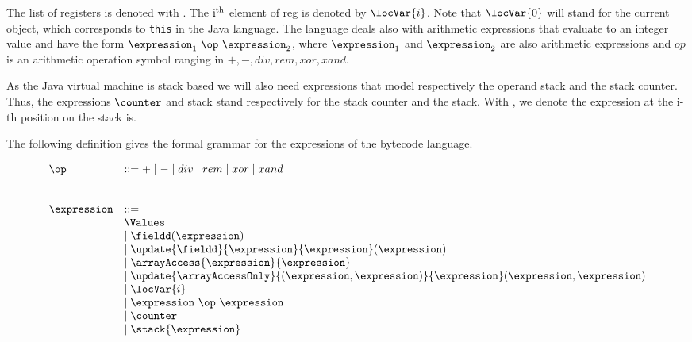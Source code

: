 The list of registers is denoted with \locVarOnly. The $\rm{i^{th}}$ element of \textrm{reg} is denoted by 
$\locVar{i}$. Note that $\locVar{0}$ will stand for the current object, 
which corresponds to \texttt{this} in the Java language. 
 The language deals also with arithmetic expressions that evaluate to an integer value and have the form $\expression_1 \ \op \ \expression_2 $,
 where  $ \expression_1$ and $\expression_2$ are also arithmetic expressions and $op$ is an arithmetic operation symbol
 ranging in $+, - , div, rem , xor, xand $. 

As the Java virtual machine is stack based we will also 
need expressions that model respectively the operand stack and the stack counter.
Thus, the expressions $\counter$ and  \textrm{stack} stand respectively for the stack counter and the stack. 
With , we denote the expression at the \textrm{i}-th position 
on the stack is. 

The following definition gives the formal grammar for the expressions of the bytecode language.
\begin{Expression} \label{expr}
    
\end{Expression}

  $$ 
  \begin{array}{ll}  
    \op             & ::= + \mid - \mid div \mid rem \mid xor \mid xand  \\
		    &                                                \\
		    &                                                \\
    \expression     & ::= \\
                    &  \Values \\
	            &  \mid  \fieldd(\expression) \\
		    &  \mid  \update{\fieldd}{ \expression}{\expression}(\expression) \\
		    &  \mid  \arrayAccess{\expression} {\expression} \\	   
		    &  \mid \update{ \arrayAccessOnly}{ (\expression , \expression)}{ \expression} (\expression,\expression) \\	
		    &  \mid  \locVar{i} \\ 
		    &  \mid  \expression \ \op \ \expression   \\
		    &  \mid  \counter \\
		    &  \mid  \stack{ \expression} \\
 \end{array} 
 $$


